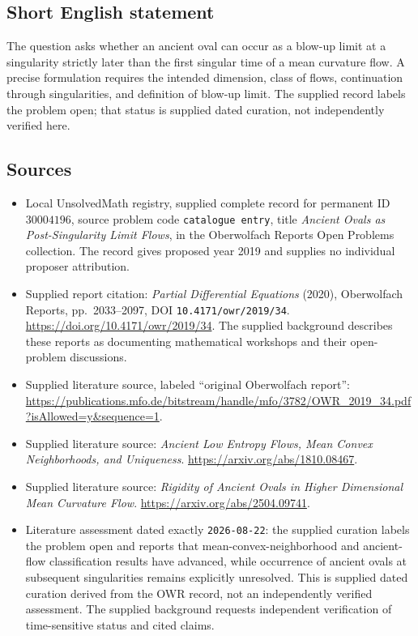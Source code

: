 \documentclass[11pt]{article}
\begin{document}
\subsection{Short English statement}
The question asks whether an ancient oval can occur as a blow-up limit at a singularity strictly later than the first singular time of a mean curvature flow. A precise formulation requires the intended dimension, class of flows, continuation through singularities, and definition of blow-up limit. The supplied record labels the problem open; that status is supplied dated curation, not independently verified here.
\subsection{Sources}
\begin{itemize}
\item Local UnsolvedMath registry, supplied complete record for permanent ID \(30004196\), source problem code \texttt{catalogue entry}, title \emph{Ancient Ovals as Post-Singularity Limit Flows}, in the Oberwolfach Reports Open Problems collection. The record gives proposed year 2019 and supplies no individual proposer attribution.
\item Supplied report citation: \emph{Partial Differential Equations} (2020), Oberwolfach Reports, pp.\ 2033--2097, DOI \texttt{10.4171/owr/2019/34}. \url{https://doi.org/10.4171/owr/2019/34}. The supplied background describes these reports as documenting mathematical workshops and their open-problem discussions.
\item Supplied literature source, labeled ``original Oberwolfach report'': \url{https://publications.mfo.de/bitstream/handle/mfo/3782/OWR_2019_34.pdf?isAllowed=y&sequence=1}.
\item Supplied literature source: \emph{Ancient Low Entropy Flows, Mean Convex Neighborhoods, and Uniqueness}. \url{https://arxiv.org/abs/1810.08467}.
\item Supplied literature source: \emph{Rigidity of Ancient Ovals in Higher Dimensional Mean Curvature Flow}. \url{https://arxiv.org/abs/2504.09741}.
\item Literature assessment dated exactly \texttt{2026-08-22}: the supplied curation labels the problem open and reports that mean-convex-neighborhood and ancient-flow classification results have advanced, while occurrence of ancient ovals at subsequent singularities remains explicitly unresolved. This is supplied dated curation derived from the OWR record, not an independently verified assessment. The supplied background requests independent verification of time-sensitive status and cited claims.
\end{itemize}
\end{document}

